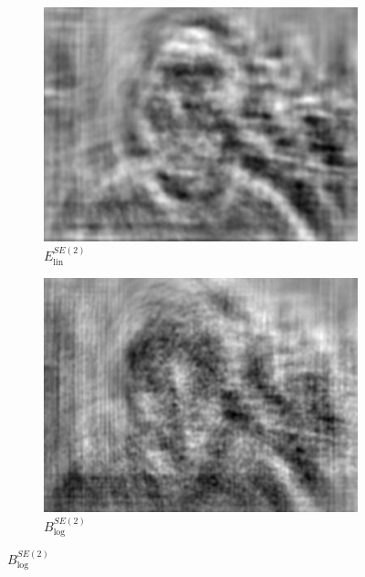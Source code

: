\documentclass{article}
\begin{document}
\begin{figure}[h!]
\begin{subfigure}[b]{0.1\textwidth}
        \label{fig:mean and std of net44}
    \end{subfigure}
    \hspace{-1\baselineskip}
    \quad
    \begin{subfigure}[b]{0.1\textwidth}   
        \centering 
        \includegraphics[width=\textwidth]{plots/E_lin_SE2_conv.jpg}
        \caption{$E_{\text{lin}}^{SE(2)}$}%
        
        \label{fig:mean and std of net44}
    \end{subfigure}
    \hspace{-1\baselineskip}
    \quad
    \begin{subfigure}[b]{0.1\textwidth}   
        \centering 
        \includegraphics[width=\textwidth]{plots/B_log_SE2_conv.jpg}
        \caption{$B_{\text{log}}^{SE(2)}$}%
        

\end{subfigure}
\end{figure}
\end{document}
